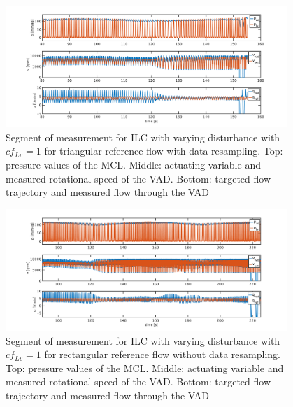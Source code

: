 \begin{figure}[ht!]
  \centering
  \includegraphics[width=0.95\textwidth]{images/chapt_5/ILC/ilc_var_dist_fix_triang.pdf}
  \caption[Segment of measurement for ILC with varying disturbance with $cf_{Lv}=1$ for triangular reference flow with data resampling]{Segment of measurement for ILC with varying disturbance with $cf_{Lv}=1$ for triangular reference flow with data resampling. Top:  pressure values of the MCL. Middle: actuating variable and measured rotational speed of the VAD. Bottom: targeted flow trajectory and measured flow through the VAD}
   \label{fig:anh_12}
\end{figure}

\begin{figure}[ht!]
  \centering
  \includegraphics[width=0.95\textwidth]{images/chapt_5/ILC/ilc_var_dist_unfix_rect.pdf}
  \caption[Segment of measurement for ILC with varying disturbance with $cf_{Lv}=1$ for rectangular reference flow without data resampling]{Segment of measurement for ILC with varying disturbance with $cf_{Lv}=1$ for rectangular reference flow without data resampling. Top:  pressure values of the MCL. Middle: actuating variable and measured rotational speed of the VAD. Bottom: targeted flow trajectory and measured flow through the VAD}
   \label{fig:anh_13}
\end{figure}

